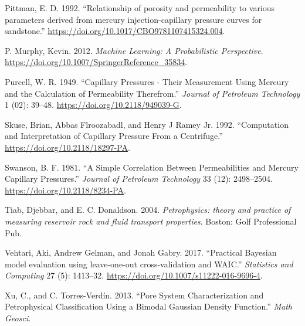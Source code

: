 \documentclass[english,msc,numbers]{coppe}
\begin{document}
  \leavevmode\hypertarget{ref-Pittman1992}{}%
  Pittman, E. D. 1992. ``Relationship of porosity and permeability to various parameters derived from mercury injection-capillary pressure curves for sandstone.'' \url{https://doi.org/10.1017/CBO9781107415324.004}.
  
  \leavevmode\hypertarget{ref-P.Murphy2012}{}%
  P. Murphy, Kevin. 2012. \emph{Machine Learning: A Probabilistic Perspective}. \url{https://doi.org/10.1007/SpringerReference_35834}.
  
  \leavevmode\hypertarget{ref-Purcell1949}{}%
  Purcell, W. R. 1949. ``Capillary Pressures - Their Measurement Using Mercury and the Calculation of Permeability Therefrom.'' \emph{Journal of Petroleum Technology} 1 (02): 39--48. \url{https://doi.org/10.2118/949039-G}.
  
  \leavevmode\hypertarget{ref-Skuse1992}{}%
  Skuse, Brian, Abbas Flroozabadl, and Henry J Ramey Jr. 1992. ``Computation and Interpretation of Capillary Pressure From a Centrifuge.'' \url{https://doi.org/10.2118/18297-PA}.
  
  \leavevmode\hypertarget{ref-Swanson1981}{}%
  Swanson, B. F. 1981. ``A Simple Correlation Between Permeabilities and Mercury Capillary Pressures.'' \emph{Journal of Petroleum Technology} 33 (12): 2498--2504. \url{https://doi.org/10.2118/8234-PA}.
  
  \leavevmode\hypertarget{ref-Tiab2004}{}%
  Tiab, Djebbar, and E. C. Donaldson. 2004. \emph{Petrophysics: theory and practice of measuring reservoir rock and fluid transport properties}. Boston: Golf Professional Pub.
  
  \leavevmode\hypertarget{ref-Vehtari2017}{}%
  Vehtari, Aki, Andrew Gelman, and Jonah Gabry. 2017. ``Practical Bayesian model evaluation using leave-one-out cross-validation and WAIC.'' \emph{Statistics and Computing} 27 (5): 1413--32. \url{https://doi.org/10.1007/s11222-016-9696-4}.
  
  \leavevmode\hypertarget{ref-Xu2013}{}%
  Xu, C., and C. Torres-Verdín. 2013. ``Pore System Characterization and Petrophysical Classification Using a Bimodal Gaussian Density Function.'' \emph{Math Geosci}.
  

\end{document}
